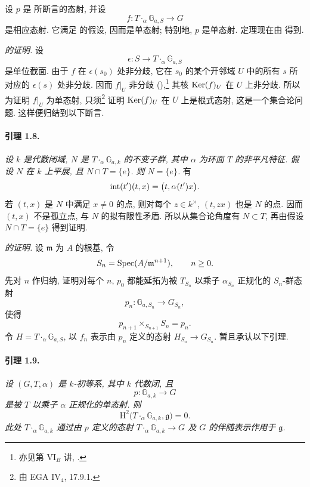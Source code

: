 设 \(p\) 是  所断言的态射, 并设
\[
  f\colon T\mathbin{\cdot_\alpha}\mathbb G_{a,S}\longrightarrow G
\]
是相应态射. 它满足  的假设, 因而是单态射; 特别地, \(p\) 是单态射. 定理现在由 得到.

\medskip
\noindent\emph{ 的证明.}
设
\[
  \epsilon\colon S\longrightarrow
    T\mathbin{\cdot_\alpha}\mathbb G_{a,S}
\]
是单位截面. 由于 \(f\) 在 \(\epsilon(s_0)\) 处非分歧, 它在 \(s_0\) 的某个开邻域 \(U\) 中的所有 \(s\) 所对应的 \(\epsilon(s)\) 处非分歧. 因而 \(f|_U\) 非分歧 \textup{()},\footnote{亦见第 VI\(_B\) 讲, .} 其核 \(\operatorname{Ker}(f)_U\) 在 \(U\) 上非分歧. 所以为证明 \(f|_U\) 为单态射, 只须\footnote{由 EGA IV\(_4\), 17.9.1.} 证明 \(\operatorname{Ker}(f)_U\) 在 \(U\) 上是根式态射, 这是一个集合论问题. 这样便归结到以下断言.

\paragraph{\textbf{引理 1.8.}}
\emph{设 \(k\) 是代数闭域, \(N\) 是 \(T\mathbin{\cdot_\alpha}\mathbb G_{a,k}\) 的不变子群, 其中 \(\alpha\) 为环面 \(T\) 的非平凡特征. 假设 \(N\) 在 \(k\) 上平展, 且 \(N\cap T=\{e\}\). 则 \(N=\{e\}\).}
有
\[
  \operatorname{int}(t')(t,x)=\bigl(t,\alpha(t')x\bigr).
\]
若 \((t,x)\) 是 \(N\) 中满足 \(x\neq0\) 的点, 则对每个 \(z\in k^\times\), \((t,zx)\) 也是 \(N\) 的点. 因而 \((t,x)\) 不是孤立点, 与 \(N\) 的拟有限性矛盾. 所以从集合论角度有 \(N\subset T\), 再由假设 \(N\cap T=\{e\}\) 得到证明.

\medskip
\noindent\emph{ 的证明.}
设 \(\mathfrak m\) 为 \(A\) 的根基, 令
\[
  S_n=\operatorname{Spec}(A/\mathfrak m^{n+1}),\qquad n\geq 0.
\]
先对 \(n\) 作归纳, 证明对每个 \(n\), \(p_0\) 都能延拓为被 \(T_{S_n}\) 以乘子 \(\alpha_{S_n}\) 正规化的 \(S_n\)-群态射
\[
  p_n\colon\mathbb G_{a,S_n}\longrightarrow G_{S_n},
\]
使得
\[
  p_{n+1}\times_{S_{n+1}}S_n=p_n.
\]
令 \(H=T\mathbin{\cdot_\alpha}\mathbb G_{a,S}\), 以 \(f_n\) 表示由 \(p_n\) 定义的态射 \(H_{S_n}\to G_{S_n}\). 暂且承认以下引理.

\paragraph{\textbf{引理 1.9.}}
\emph{设 \((G,T,\alpha)\) 是 \(k\)-初等系, 其中 \(k\) 代数闭, 且
\[
  p\colon\mathbb G_{a,k}\longrightarrow G
\]
是被 \(T\) 以乘子 \(\alpha\) 正规化的单态射. 则}
\[
  \mathrm H^2\bigl(T\mathbin{\cdot_\alpha}\mathbb G_{a,k},
    \mathfrak g\bigr)=0.
\]
\emph{此处 \(T\mathbin{\cdot_\alpha}\mathbb G_{a,k}\) 通过由 \(p\) 定义的态射 \(T\mathbin{\cdot_\alpha}\mathbb G_{a,k}\to G\) 及 \(G\) 的伴随表示作用于 \(\mathfrak g\).}

